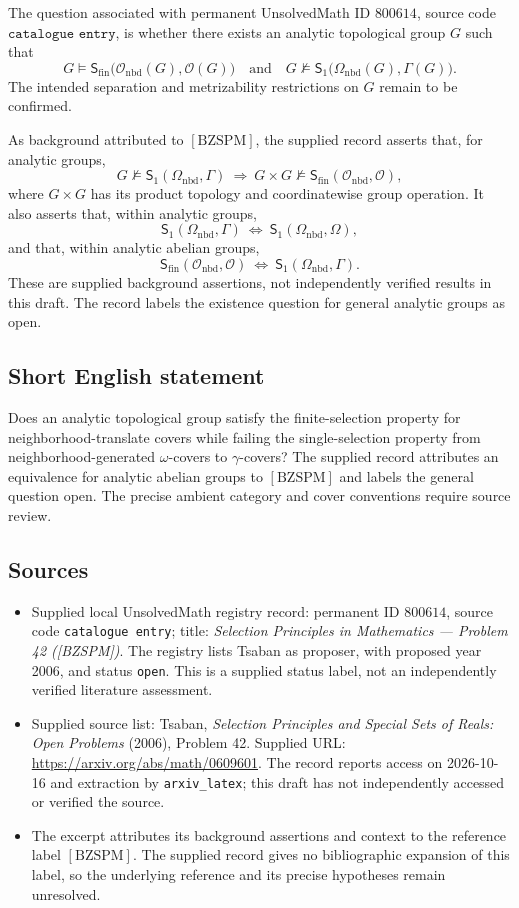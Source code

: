 \documentclass[11pt]{article}
\begin{document}
The question associated with permanent UnsolvedMath ID \(800614\), source code \(\texttt{catalogue entry}\), is whether there exists an analytic topological group \(G\) such that
\[
G\models\mathsf S_{\mathrm{fin}}\bigl(\mathcal O_{\mathrm{nbd}}(G),\mathcal O(G)\bigr)
\quad\text{and}\quad
G\not\models\mathsf S_1\bigl(\Omega_{\mathrm{nbd}}(G),\Gamma(G)\bigr).
\]
The intended separation and metrizability restrictions on \(G\) remain to be confirmed.

As background attributed to \([\mathrm{BZSPM}]\), the supplied record asserts that, for analytic groups,
\[
G\not\models\mathsf S_1(\Omega_{\mathrm{nbd}},\Gamma)
\ \Longrightarrow\
G\times G\not\models\mathsf S_{\mathrm{fin}}(\mathcal O_{\mathrm{nbd}},\mathcal O),
\]
where \(G\times G\) has its product topology and coordinatewise group operation. It also asserts that, within analytic groups,
\[
\mathsf S_1(\Omega_{\mathrm{nbd}},\Gamma)
\ \Longleftrightarrow\
\mathsf S_1(\Omega_{\mathrm{nbd}},\Omega),
\]
and that, within analytic abelian groups,
\[
\mathsf S_{\mathrm{fin}}(\mathcal O_{\mathrm{nbd}},\mathcal O)
\ \Longleftrightarrow\
\mathsf S_1(\Omega_{\mathrm{nbd}},\Gamma).
\]
These are supplied background assertions, not independently verified results in this draft. The record labels the existence question for general analytic groups as open.
\subsection{Short English statement}
Does an analytic topological group satisfy the finite-selection property for neighborhood-translate covers while failing the single-selection property from neighborhood-generated \(\omega\)-covers to \(\gamma\)-covers? The supplied record attributes an equivalence for analytic abelian groups to \([\mathrm{BZSPM}]\) and labels the general question open. The precise ambient category and cover conventions require source review.
\subsection{Sources}
\begin{itemize}
\item Supplied local UnsolvedMath registry record: permanent ID \(800614\), source code \texttt{catalogue entry}; title: \emph{Selection Principles in Mathematics --- Problem 42 ([BZSPM])}. The registry lists Tsaban as proposer, with proposed year 2006, and status \texttt{open}. This is a supplied status label, not an independently verified literature assessment.
\item Supplied source list: Tsaban, \emph{Selection Principles and Special Sets of Reals: Open Problems} (2006), Problem 42. Supplied URL: \url{https://arxiv.org/abs/math/0609601}. The record reports access on 2026-10-16 and extraction by \texttt{arxiv\_latex}; this draft has not independently accessed or verified the source.
\item The excerpt attributes its background assertions and context to the reference label \([\mathrm{BZSPM}]\). The supplied record gives no bibliographic expansion of this label, so the underlying reference and its precise hypotheses remain unresolved.
\end{itemize}
\end{document}
